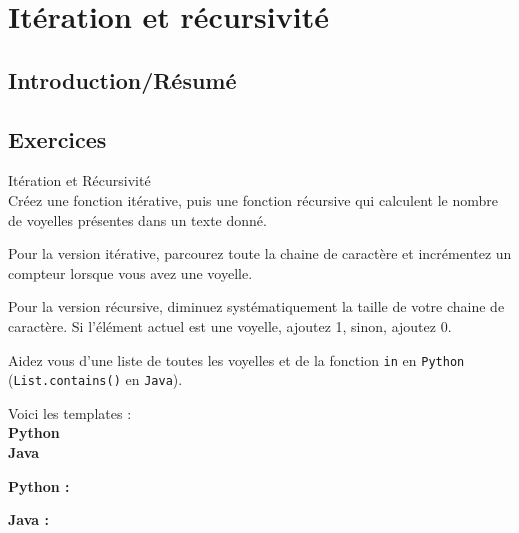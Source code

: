 \section{Itération et récursivité}

\subsection{Introduction/Résumé}

\subsection{Exercices}

\begin{Exercice}[15 min] Itération et Récursivité\\

Créez une fonction itérative, puis une fonction récursive qui calculent le nombre de voyelles présentes dans un texte donné. \\

\begin{conseil}
   Pour la version itérative, parcourez toute la chaine de caractère et incrémentez un compteur lorsque vous avez une voyelle.
   
   Pour la version récursive, diminuez systématiquement la taille de votre chaine de caractère. Si l'élément actuel est une voyelle, ajoutez 1, sinon, ajoutez 0.
   
   Aidez vous d'une liste de toutes les voyelles et de la fonction \lstinline{in} en \lstinline{Python} (\lstinline{List.contains()} en \lstinline{Java}).
\end{conseil}

Voici les templates : \\

\textbf{Python} \\

	 

\textbf{Java} \\

	

    
\begin{solution}
\textbf{Python :} \\

    
    
\end{solution}


\begin{solution}   
\textbf{Java :} \\

    
    
    
    
\end{solution}

\end{Exercice}

